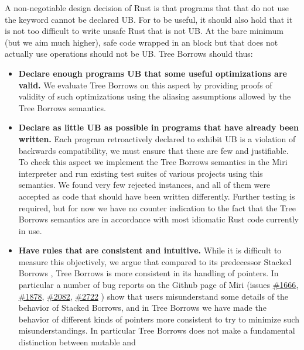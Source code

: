 \documentclass[a4paper,11pt]{article}
\theoremstyle{plain}
\theoremstyle{definition}
\theoremstyle{remark}
\newcommand{\tcode}[1]{\rstinline{#1}}
\begin{document}
A non-negotiable design decision of Rust is that programs that that do not use the
\tcode{unsafe} keyword cannot be declared UB. For \tcode{unsafe} to be useful,
it should also hold that it is not too difficult to write unsafe Rust that is not
UB. At the bare minimum (but we aim much higher), safe code wrapped in an \tcode{unsafe} block but that does
not actually use \tcode{unsafe} operations should not be UB. Tree Borrows should thus:
\begin{itemize}
    \item \textbf{Declare enough programs UB that some useful optimizations are valid.}
        We evaluate Tree Borrows on this aspect by providing proofs of validity of such
        optimizations using the aliasing assumptions allowed by the Tree Borrows semantics.
    \item \textbf{Declare as little UB as possible in programs that have already been written.}
        Each program retroactively declared to exhibit UB is a violation of backwards compatibility,
        we must ensure that these are few and justifiable.
        To check this aspect we implement the Tree Borrows semantics in the Miri
        interpreter \cite{miri} and run existing test suites of various projects using this semantics.
        We found very few rejected instances, and all of them were accepted as
        code that should have been written differently. Further testing is required,
        but for now we have no counter indication to the fact that the Tree Borrows
        semantics are in accordance with most idiomatic Rust code currently in use.
    \item \textbf{Have rules that are consistent and intuitive.}
        While it is difficult to measure this objectively, we argue that compared
        to its predecessor Stacked Borrows \cite{stacked_borrows},
        Tree Borrows is more consistent in its handling of pointers. In particular
        a number of bug reports on the Github page of Miri (issues
        \href{https://github.com/rust-lang/miri/issues/1666}{\#1666},
        \href{https://github.com/rust-lang/miri/issues/1878}{\#1878},
        \href{https://github.com/rust-lang/miri/issues/2082}{\#2082},
        \href{https://github.com/rust-lang/miri/issues/2722}{\#2722}
        ) show that users misunderstand some details of the behavior of Stacked Borrows,
        and in Tree Borrows we have made the behavior of different kinds of pointers
        more consistent to try to minimize such misunderstandings. In particular
        Tree Borrows does not make a fundamental distinction between mutable and

\end{itemize}
\end{document}
